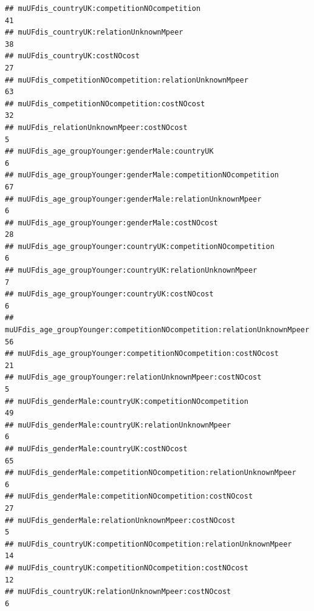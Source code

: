 \documentclass[
]{article}
\begin{document}
\begin{verbatim}
## muUFdis_countryUK:competitionNOcompetition                                                         41
## muUFdis_countryUK:relationUnknownMpeer                                                             38
## muUFdis_countryUK:costNOcost                                                                       27
## muUFdis_competitionNOcompetition:relationUnknownMpeer                                              63
## muUFdis_competitionNOcompetition:costNOcost                                                        32
## muUFdis_relationUnknownMpeer:costNOcost                                                             5
## muUFdis_age_groupYounger:genderMale:countryUK                                                       6
## muUFdis_age_groupYounger:genderMale:competitionNOcompetition                                       67
## muUFdis_age_groupYounger:genderMale:relationUnknownMpeer                                            6
## muUFdis_age_groupYounger:genderMale:costNOcost                                                     28
## muUFdis_age_groupYounger:countryUK:competitionNOcompetition                                         6
## muUFdis_age_groupYounger:countryUK:relationUnknownMpeer                                             7
## muUFdis_age_groupYounger:countryUK:costNOcost                                                       6
## muUFdis_age_groupYounger:competitionNOcompetition:relationUnknownMpeer                             56
## muUFdis_age_groupYounger:competitionNOcompetition:costNOcost                                       21
## muUFdis_age_groupYounger:relationUnknownMpeer:costNOcost                                            5
## muUFdis_genderMale:countryUK:competitionNOcompetition                                              49
## muUFdis_genderMale:countryUK:relationUnknownMpeer                                                   6
## muUFdis_genderMale:countryUK:costNOcost                                                            65
## muUFdis_genderMale:competitionNOcompetition:relationUnknownMpeer                                    6
## muUFdis_genderMale:competitionNOcompetition:costNOcost                                             27
## muUFdis_genderMale:relationUnknownMpeer:costNOcost                                                  5
## muUFdis_countryUK:competitionNOcompetition:relationUnknownMpeer                                    14
## muUFdis_countryUK:competitionNOcompetition:costNOcost                                              12
## muUFdis_countryUK:relationUnknownMpeer:costNOcost                                                   6

\end{verbatim}
\end{document}
